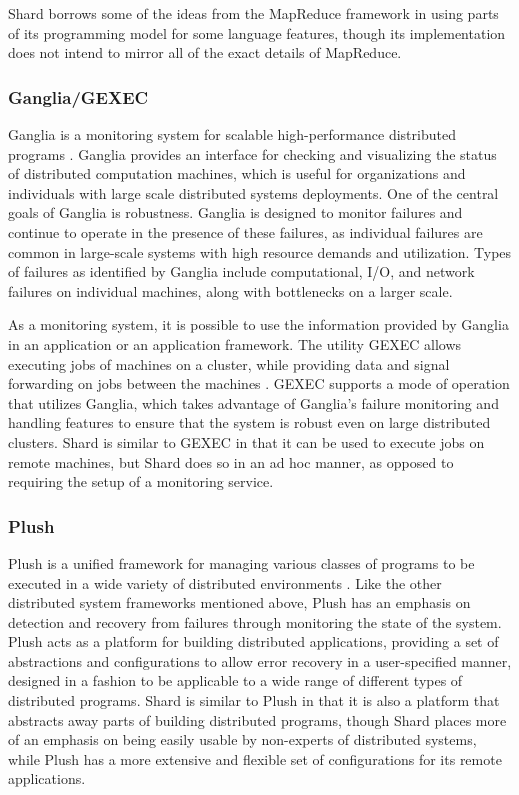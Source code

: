\documentclass[oneside]{report}
\begin{document}
Shard borrows some of the ideas from the MapReduce framework in using parts of its programming model for some language features, though its implementation does not intend to mirror all of the exact details of MapReduce.

\subsubsection{Ganglia/GEXEC}
Ganglia is a monitoring system for scalable high-performance distributed programs \cite{MASSIE2004817}.
Ganglia provides an interface for checking and visualizing the status of distributed computation machines, which is useful for organizations and individuals with large scale distributed systems deployments.
One of the central goals of Ganglia is robustness.
Ganglia is designed to monitor failures and continue to operate in the presence of these failures, as individual failures are common in large-scale systems with high resource demands and utilization.
Types of failures as identified by Ganglia include computational, I/O, and network failures on individual machines, along with bottlenecks on a larger scale.

As a monitoring system, it is possible to use the information provided by Ganglia in an application or an application framework.
The utility GEXEC allows executing jobs of machines on a cluster, while providing data and signal forwarding on jobs between the machines \cite{gexec}.
GEXEC supports a mode of operation that utilizes Ganglia, which takes advantage of Ganglia's failure monitoring and handling features to ensure that the system is robust even on large distributed clusters.
Shard is similar to GEXEC in that it can be used to execute jobs on remote machines, but Shard does so in an ad hoc manner, as opposed to requiring the setup of a monitoring service.

\subsubsection{Plush}
Plush is a unified framework for managing various classes of programs to be executed in a wide variety of distributed environments \cite{10.5555/1349426.1349441}.
Like the other distributed system frameworks mentioned above, Plush has an emphasis on detection and recovery from failures through monitoring the state of the system.
Plush acts as a platform for building distributed applications, providing a set of abstractions and configurations to allow error recovery in a user-specified manner, designed in a fashion to be applicable to a wide range of different types of distributed programs.
Shard is similar to Plush in that it is also a platform that abstracts away parts of building distributed programs, though Shard places more of an emphasis on being easily usable by non-experts of distributed systems, while Plush has a more extensive and flexible set of configurations for its remote applications.
\end{document}
